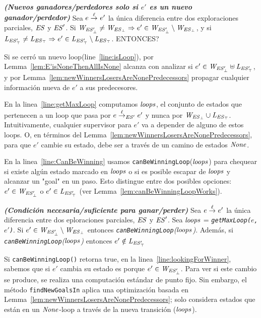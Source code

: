 \begin{lemma}\textbf{\emph{(Nuevos ganadores/perdedores solo si $e'$ es un nuevo ganador/perdedor)}}
\label{lem:E'isNoneThenAllIsNone}
Sea $e \overset{\ell}{\rightarrow}_{} e'$ la única diferencia entre dos exploraciones parciales, $\mathit{ES}$ y $\mathit{ES}'$. Si $\mathit{W_{\mathit{\mathit{ES}'_{\bot}}}} \neq \mathit{W_{\mathit{\mathit{ES}_{\bot}}}} \Rightarrow e' \in \mathit{W_{\mathit{\mathit{ES}'_{\bot}}}} \setminus \mathit{W_{\mathit{\mathit{ES}_{\bot}}}}$, y si $\mathit{L_{\mathit{\mathit{ES}'_{\top}}}} \neq \mathit{L_{\mathit{\mathit{ES}_{\top}}}} \Rightarrow e' \in \mathit{L_{\mathit{\mathit{ES}'_{\top}}}} \setminus \mathit{L_{\mathit{\mathit{ES}_{\top}}}}$. ENTONCES?
\end{lemma}


Si se cerró un nuevo loop(line~\ref{line:isLoop}), por Lemma~\ref{lem:E'isNoneThenAllIsNone} alcanza con analizar si $e' 
\in \mathit{W_{\mathit{\mathit{ES}'_{\bot}}}} \uplus \mathit{L_{\mathit{\mathit{ES}'_{\top}}}}$, y por Lemma~\ref{lem:newWinnersLosersAreNonePredecessors} propagar cualquier información nueva de $e'$ a sus predecesores. 

En la linea~\ref{line:getMaxLoop} computamos $\mathit{loops}$, el conjunto de estados que pertenecen a un loop que pasa por $e \overset{\ell}{\rightarrow}_{\mathit{ES}'} e'$ y nunca por $\mathit{W_{\mathit{\mathit{ES}_{\bot}}}} \cup \mathit{L_{\mathit{\mathit{ES}_{\top}}}}$. 
Intuitivamente, cualquier supervisor para $e'$ va a depender de alguno de estos loops. O, en términos del Lemma~\ref{lem:newWinnersLosersAreNonePredecessors}, para que $e'$ cambie su estado, debe ser a través de un camino de estados $\mathit{None}$. 

En la linea~\ref{line:CanBeWinning} usamos \texttt{canBeWinningLoop}($\mathit{loops}$) para chequear si existe algún estado marcado en $\mathit{loops}$ o si es posible escapar de $\mathit{loops}$ y alcanzar un "goal" en un paso. Esto distingue entre dos posibles opciones: $e' \in \mathit{W_{\mathit{\mathit{ES}'_{\bot}}}}$ o $e' \in \mathit{L_{\mathit{\mathit{ES}'_{\top}}}}$ (ver 
Lemma~\ref{lem:canBeWinningLoopWorks}). 

\begin{lemma}\textbf{\emph{(Condición necesaria/suficiente para ganar/perder)}}
\label{lem:canBeWinningLoopWorks}
Sea $e \overset{\ell}{\rightarrow}_{} e'$ la única diferencia entre dos eploraciones parciales, 
$\mathit{ES}$ y $\mathit{ES}'$. Sea $\mathit{loops}$ = \emph{\texttt{getMaxLoop($e$, 
$e'$)}}.
Si $e' \in \mathit{W_{\mathit{\mathit{ES}'_{\bot}}}} \setminus \mathit{W_{\mathit{\mathit{ES}_{\bot}}}}$ 
entonces \emph{\texttt{canBeWinningLoop}($\mathit{loops}$)}. Además, si \\ 
\emph{\texttt{canBeWinningLoop}($\mathit{loops}$)} entonces $e' \notin \mathit{L_{\mathit{\mathit{ES}'_{\top}}}}$ 
\end{lemma}


Si \texttt{canBeWinningLoop()} retorna true, en la  linea~\ref{line:lookingForWinner}, 
sabemos que si $e'$ cambia su estado es porque $e' \in \mathit{W_{\mathit{\mathit{ES}'_{\bot}}}}$. Para ver si este cambio se produce, se realiza una computación estándar de punto fijo. 
Sin embargo, el método \texttt{findNewGoalsIn} aplica una optimización basada en Lemma~\ref{lem:newWinnersLosersAreNonePredecessors}; solo considera estados que están en un $\mathit{None}$-loop a través de la nueva transición ($\mathit{loops}$).

